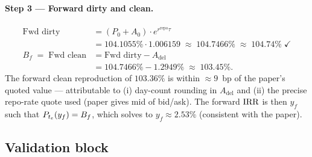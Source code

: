 \documentclass[11pt,a4paper]{article}
\newcommand{\Adel}{A_{\mathrm{del}}}
\newcommand{\Bf}{B_f}
\newcommand{\rrepo}{r^{\mathrm{repo}}}
\begin{document}
\paragraph{Step 3 --- Forward dirty and clean.}
\begin{align*}
  \text{Fwd dirty} &= (P_0 + A_0) \cdot e^{\rrepo \tau}\\
                   &= 104.1055\% \cdot 1.006159 \;\approx\; 104.7466\%
                    \;\approx\; \mathbf{104.74\%} \;\checkmark\\
  \Bf \;=\; \text{Fwd clean} &= \text{Fwd dirty} - \Adel\\
                             &= 104.7466\% - 1.2949\% \;\approx\; \mathbf{103.45\%}.
\end{align*}
The forward clean reproduction of $103.36\%$ is within $\approx 9$~bp
of the paper's quoted value --- attributable to (i) day-count
rounding in $\Adel$ and (ii) the precise repo-rate quote used (paper
gives mid of bid/ask). The forward $\mathrm{IRR}$ is then $y_f$ such that
$\Bond{t_e}{y_f} = \Bf$, which solves to $y_f \approx 2.53\%$
(consistent with the paper).

\subsection{Validation block}
\end{document}
